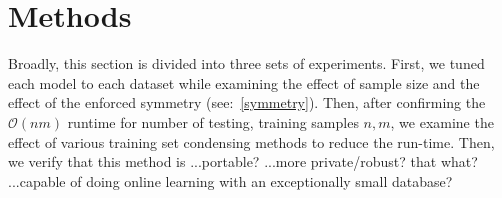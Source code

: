 \documentclass{article}
\begin{document}
\section{Methods}
Broadly, this section is divided into three sets of experiments. First, we tuned each model to each dataset while examining the effect of sample size and the effect of the enforced symmetry (see:~\ref{symmetry}). Then, after confirming the $\mathcal{O}(nm)$ runtime for number of testing, training samples $n,m$, we examine the effect of various training set condensing methods to reduce the run-time. Then, we verify that this method is ...portable?
...more private/robust? that what?
...capable of doing online learning with an exceptionally small database?



\label{methods}
\end{document}
